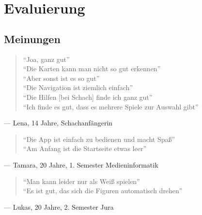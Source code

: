 \chapter{Evaluierung}

\section{Meinungen}

\begin{quote}
``Joa, ganz gut'' \\
``Die Karten kann man nicht so gut erkennen'' \\
``Aber sonst ist es so gut'' \\
``Die Navigation ist ziemlich einfach'' \\
``Die Hilfen [bei Schach] finde ich ganz gut'' \\
``Ich finde es gut, dass es mehrere Spiele zur Auswahl gibt''
\end{quote}
--- Lena, 14 Jahre, Schachanfängerin
\begin{quote}
``Die App ist einfach zu bedienen und macht Spaß'' \\
``Am Anfang ist die Startseite etwas leer'' 
\end{quote}
--- Tamara, 20 Jahre, 1. Semester Medieninformatik
\begin{quote}
``Man kann leider nur als Weiß spielen'' \\
``Es ist gut, das sich die Figuren automatisch drehen'' 
\end{quote}
--- Lukas, 20 Jahre, 2. Semester Jura

